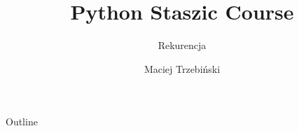 \documentclass[aspectratio=43,english]{beamer}
\title{Python Staszic Course}
\subtitle{Rekurencja}
\author{Maciej Trzebiński}
\date{}
\begin{document}
    \maketitle

    \begin{frame}{Outline}
        \tableofcontents
    \end{frame}

    
\end{document}
